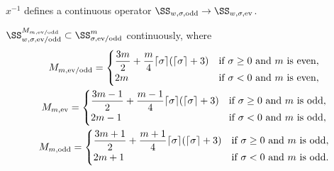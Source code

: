 \begin{Corollary}\label{c:x^-1:SS_w,sigma,odd to SS_w,sigma,ev}
  $x^{-1}$ defines a continuous operator $\SS_{w,\sigma,\text{\rm odd}}\to\SS_{w,\sigma,\text{\rm ev}}$.
\end{Corollary}

\begin{Lemma}\label{l:SS_w,sigma^M_m subset SS_sigma^m}
  $\SS_{w,\sigma,\text{\rm ev/odd}}^{M_{m,\text{\rm ev/odd}}}\subset\SS_{\sigma,\text{\rm ev/odd}}^m$ continuously, where
    \begin{gather*}
      M_{m,\text{\rm ev/odd}} =
        \begin{cases}
          \dfrac{3m}{2}+\dfrac{m}{4} \lceil\sigma\rceil(\lceil\sigma\rceil+3) & \text{if $\sigma\ge0$ and $m$ is even},\\
          2m & \text{if $\sigma<0$ and $m$ is even} ,
        \end{cases}
      \\
      M_{m,\text{\rm ev}} =
        \begin{cases}
          \dfrac{3m-1}{2}+\dfrac{m-1}{4} \lceil\sigma\rceil(\lceil\sigma\rceil+3) & \text{if $\sigma\ge0$ and $m$ is odd},\\
          2m-1 & \text{if $\sigma<0$ and $m$ is odd} ,
        \end{cases}
      \\
      M_{m,\text{\rm odd}} =
        \begin{cases}
          \dfrac{3m+1}{2}+\dfrac{m+1}{4} \lceil\sigma\rceil(\lceil\sigma\rceil+3)
          & \text{if $\sigma\ge0$ and $m$ is odd},\\
          2m+1 & \text{if $\sigma<0$ and $m$ is odd} .
        \end{cases}
    \end{gather*}
\end{Lemma}

